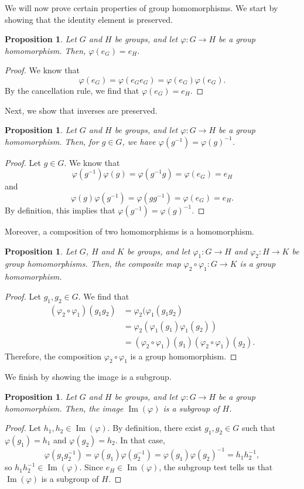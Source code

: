\documentclass[a4paper, openany]{memoir}
\theoremstyle{definition}
\theoremstyle{plain}
\newtheorem{proposition}[definition]{Proposition}
\begin{document}
We will now prove certain properties of group homomorphisms. We start by showing that the identity element is preserved.
\begin{proposition}
Let $G$ and $H$ be groups, and let $\varphi: G \to H$ be a group homomorphism. Then, $\varphi(e_G) = e_H$.
\end{proposition}
\begin{proof}
We know that
\[\varphi(e_G) = \varphi(e_G e_G) = \varphi(e_G) \varphi(e_G).\]
By the cancellation rule, we find that $\varphi(e_G) = e_H$.
\end{proof}
\noindent Next, we show that inverses are preserved.
\begin{proposition}
Let $G$ and $H$ be groups, and let $\varphi: G \to H$ be a group homomorphism. Then, for $g \in G$, we have $\varphi(g^{-1}) = \varphi(g)^{-1}$.
\end{proposition}
\begin{proof}
Let $g \in G$. We know that
\[\varphi(g^{-1}) \varphi(g) = \varphi(g^{-1}g) = \varphi(e_G) = e_H\]
and
\[\varphi(g) \varphi(g^{-1}) = \varphi(g g^{-1}) = \varphi(e_G) = e_H.\]
By definition, this implies that $\varphi(g^{-1}) = \varphi(g)^{-1}$.
\end{proof}
\noindent Moreover, a composition of two homomorphisms is a homomorphism.
\begin{proposition}
Let $G$, $H$ and $K$ be groups, and let $\varphi_1: G \to H$ and $\varphi_2: H \to K$ be group homomorphisms. Then, the composite map $\varphi_2 \circ \varphi_1: G \to K$ is a group homomorphism.
\end{proposition}
\begin{proof}
Let $g_1, g_2 \in G$. We find that
\begin{align*}
    (\varphi_2 \circ \varphi_1)(g_1 g_2) &= \varphi_2(\varphi_1(g_1 g_2) \\
    &= \varphi_2(\varphi_1(g_1) \varphi_1(g_2)) \\
    &= (\varphi_2 \circ \varphi_1)(g_1) (\varphi_2 \circ \varphi_1)(g_2).
\end{align*}
Therefore, the composition $\varphi_2 \circ \varphi_1$ is a group homomorphism.
\end{proof}
\noindent We finish by showing the image is a subgroup.
\begin{proposition}
Let $G$ and $H$ be groups, and let $\varphi: G \to H$ be a group homomorphism. Then, the image $\operatorname{Im}(\varphi)$ is a subgroup of $H$.
\end{proposition}
\begin{proof}
Let $h_1, h_2 \in \operatorname{Im}(\varphi)$. By definition, there exist $g_1, g_2 \in G$ such that $\varphi(g_1) = h_1$ and $\varphi(g_2) = h_2$. In that case,
\[\varphi(g_1 g_2^{-1}) = \varphi(g_1) \varphi(g_2^{-1}) = \varphi(g_1) \varphi(g_2)^{-1} = h_1 h_2^{-1},\]
so $h_1 h_2^{-1} \in \operatorname{Im}(\varphi)$. Since $e_H \in \operatorname{Im}(\varphi)$, the subgroup test tells us that $\operatorname{Im}(\varphi)$ is a subgroup of $H$.
\end{proof}
\end{document}
